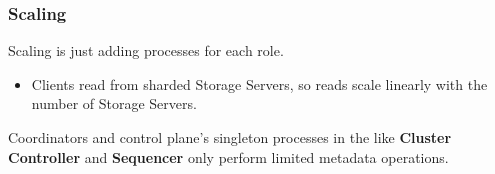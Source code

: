 \begin{frame}
	\frametitle{Scaling}
Scaling is just adding processes for each role. \\

\begin{itemize}
\item Clients read from sharded Storage Servers, so reads scale
linearly with the number of Storage Servers. 
\end{itemize}

\vspace{0.5cm}
Coordinators and control plane's singleton processes in the  like \textbf{Cluster Controller} and \textbf{Sequencer} only perform limited metadata operations.
	
\end{frame}

